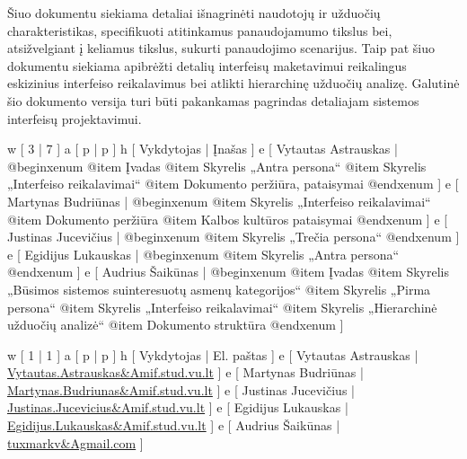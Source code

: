 
Šiuo dokumentu siekiama detaliai išnagrinėti naudotojų ir
užduočių charakteristikas, specifikuoti atitinkamus panaudojamumo
tikslus bei, atsižvelgiant į keliamus tikslus, sukurti panaudojimo
scenarijus. Taip pat šiuo dokumentu siekiama apibrėžti detalių
interfeisų maketavimui reikalingus eskizinius interfeiso reikalavimus
bei atlikti hierarchinę užduočių analizę. Galutinė šio dokumento
versija turi būti pakankamas pagrindas detaliajam sistemos interfeisų
projektavimui.

\xtable
{
  w [ 3  | 7 ]
  a [ p  | p ]
  h [ Vykdytojas | Įnašas ]
  e [ Vytautas Astrauskas
  | @begin{xenum} 
      @item Įvadas
      @item Skyrelis „Antra persona“
      @item Skyrelis „Interfeiso reikalavimai“
      @item Dokumento peržiūra, pataisymai
    @end{xenum}
  ]
  e [ Martynas Budriūnas
  | @begin{xenum} 
      @item Skyrelis „Interfeiso reikalavimai“
      @item Dokumento peržiūra
      @item Kalbos kultūros pataisymai
    @end{xenum}
  ]
  e [ Justinas Jucevičius 
  | @begin{xenum} 
      @item Skyrelis „Trečia persona“
    @end{xenum}
  ]
  e [ Egidijus Lukauskas 
  | @begin{xenum} 
      @item Skyrelis „Antra persona“
    @end{xenum}
  ]
  e [ Audrius Šaikūnas 
  | @begin{xenum} 
      @item Įvadas
      @item Skyrelis „Būsimos sistemos suinteresuotų asmenų kategorijos“
      @item Skyrelis „Pirma persona“
      @item Skyrelis „Interfeiso reikalavimai“
      @item Skyrelis „Hierarchinė užduočių analizė“
      @item Dokumento struktūra
    @end{xenum}
  ]
}

\xtableu
{
  w [ 1 | 1 ]
  a [ p | p ]
  h [ Vykdytojas | El. paštas ]
  e [ Vytautas Astrauskas | \url{Vytautas.Astrauskas&Amif.stud.vu.lt} ]
  e [ Martynas Budriūnas  | \url{Martynas.Budriunas&Amif.stud.vu.lt} ]
  e [ Justinas Jucevičius | \url{Justinas.Jucevicius&Amif.stud.vu.lt} ]
  e [ Egidijus Lukauskas  | \url{Egidijus.Lukauskas&Amif.stud.vu.lt} ]
  e [ Audrius Šaikūnas    | \url{tuxmarkv&Agmail.com} ]
}
